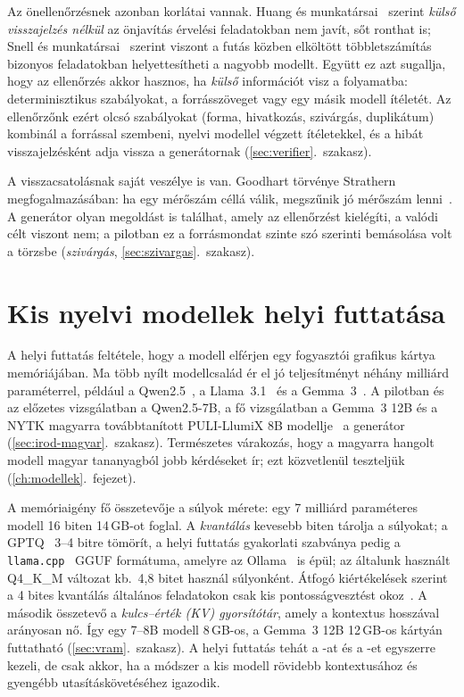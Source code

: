Az önellenőrzésnek azonban korlátai vannak. Huang és munkatársai~\cite{huang2024selfcorrect} szerint
\emph{külső visszajelzés nélkül} az önjavítás érvelési feladatokban nem javít, sőt ronthat is; Snell és
munkatársai~\cite{snell2025scaling} szerint viszont a futás közben elköltött többletszámítás bizonyos
feladatokban helyettesítheti a nagyobb modellt. Együtt ez azt sugallja, hogy az ellenőrzés akkor hasznos,
ha \emph{külső} információt visz a folyamatba: determinisztikus szabályokat, a forrásszöveget vagy egy
másik modell ítéletét. Az ellenőrzőnk ezért olcsó szabályokat (forma, hivatkozás, szivárgás, duplikátum)
kombinál a forrással szembeni, nyelvi modellel végzett ítéletekkel, és a hibát visszajelzésként adja
vissza a generátornak (\ref{sec:verifier}.~szakasz).

A visszacsatolásnak saját veszélye is van. Goodhart törvénye Strathern megfogalmazásában: ha egy
mérőszám céllá válik, megszűnik jó mérőszám lenni~\cite{strathern1997}. A generátor olyan megoldást is
találhat, amely az ellenőrzést kielégíti, a valódi célt viszont nem; a pilotban ez a forrásmondat szinte
szó szerinti bemásolása volt a törzsbe (\emph{szivárgás}, \ref{sec:szivargas}.~szakasz).

\section{Kis nyelvi modellek helyi futtatása}
\label{sec:irod-kis}

A helyi futtatás feltétele, hogy a modell elférjen egy fogyasztói grafikus kártya memóriájában. Ma több
nyílt modellcsalád ér el jó teljesítményt néhány milliárd paraméterrel, például a Qwen2.5~\cite{qwen25}, a
Llama~3.1~\cite{grattafiori2024llama3} és a Gemma~3~\cite{gemma3}. A pilotban és az előzetes vizsgálatban a
Qwen2.5-7B, a fő vizsgálatban a Gemma~3 12B és a NYTK magyarra továbbtanított PULI-LlumiX 8B
modellje~\cite{pulillumix} a generátor (\ref{sec:irod-magyar}.~szakasz). Természetes várakozás, hogy a
magyarra hangolt modell magyar tananyagból jobb kérdéseket ír; ezt közvetlenül teszteljük
(\ref{ch:modellek}.~fejezet).

A memóriaigény fő összetevője a súlyok mérete: egy 7 milliárd paraméteres modell 16 biten 14\,GB-ot
foglal. A \emph{kvantálás} kevesebb biten tárolja a súlyokat; a GPTQ~\cite{frantar2023gptq} 3--4 bitre
tömörít, a helyi futtatás gyakorlati szabványa pedig a \texttt{llama.cpp}~\cite{gerganov2023llamacpp} GGUF
formátuma, amelyre az Ollama~\cite{ollama2024} is épül; az általunk használt Q4\_K\_M változat kb.\ 4,8
bitet használ súlyonként. Átfogó kiértékelések szerint a 4 bites kvantálás általános feladatokon csak kis
pontosságvesztést okoz~\cite{li2024evalquant}. A második összetevő a \emph{kulcs--érték (KV)
gyorsítótár}, amely a kontextus hosszával arányosan nő. Így egy 7--8B modell 8\,GB-os, a Gemma~3 12B
12\,GB-os kártyán futtatható (\ref{sec:vram}.~szakasz). A helyi futtatás tehát a -at és a -et
egyszerre kezeli, de csak akkor, ha a módszer a kis modell rövidebb kontextusához és gyengébb
utasításkövetéséhez igazodik.


